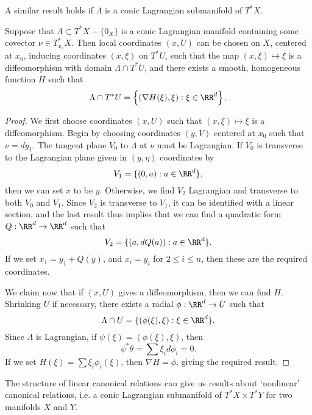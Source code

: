A similar result holds if $\Lambda$ is a conic Lagrangian submanifold of $T^* X$.

\begin{lemma}
    Suppose that $\Lambda \subset T^* X - \{ 0_X \}$ is a conic Lagrangian manifold containing some covector $\nu \in T^*_{x_0} X$. Then local coordinates $(x,U)$ can be chosen on $X$, centered at $x_0$, inducing coordinates $(x,\xi)$ on $T^* U$, such that the map $(x,\xi) \mapsto \xi$ is a diffeomorphism with domain $\Lambda \cap T^* U$, and there exists a smooth, homogeneous function $H$ such that
    \[ \Lambda \cap T^* U = \left\{ (\nabla H(\xi), \xi) : \xi \in \RR^d \right\}. \]
\end{lemma}
\begin{proof}
    We first choose coordinates $(x,U)$ such that $(x,\xi) \mapsto \xi$ is a diffeomorphism. Begin by choosing coordinates $(y,V)$ centered at $x_0$ such that $\nu = dy_1$. The tangent plane $V_0$ to $\Lambda$ at $\nu$ must be Lagrangian. If $V_0$ is transverse to the Lagrangian plane given in $(y,\eta)$ coordinates by
    \[ V_1 = \{ (0,a) : a \in \RR^d \}, \]
    then we can set $x$ to be $y$. Otherwise, we find $V_2$ Lagrangian and transverse to both $V_0$ and $V_1$. Since $V_2$ is transverse to $V_1$, it can be identified with a linear section, and the last result thus implies that we can find a quadratic form $Q: \RR^d \to \RR^d$ such that 
    \[ V_2 = \{ (a,dQ(a)) : a \in \RR^d \}. \]
    If we set $x_1 = y_1 + Q(y)$, and $x_i = y_i$ for $2 \leq i \leq n$, then these are the required coordinates.

    We claim now that if $(x,U)$ gives a diffeomorphism, then we can find $H$. Shrinking $U$ if necessary, there exists a radial $\phi: \RR^d \to U$ such that
    \[ \Lambda \cap U = \{ (\phi(\xi), \xi) : \xi \in \RR^d \}. \]
    Since $\Lambda$ is Lagrangian, if $\psi(\xi) = (\phi(\xi),\xi)$, then
    \[ \psi^* \theta = \sum \xi_i d\phi_i = 0. \]
    If we set $H(\xi) = \sum \xi_i \phi_i(\xi)$, then $\nabla H = \phi$, giving the required result.
\end{proof}

The structure of linear canonical relations can give us results about `nonlinear' canonical relations, i.e. a conic Lagrangian submanifold of $T^* X \times T^* Y$ for two manifolds $X$ and $Y$.


